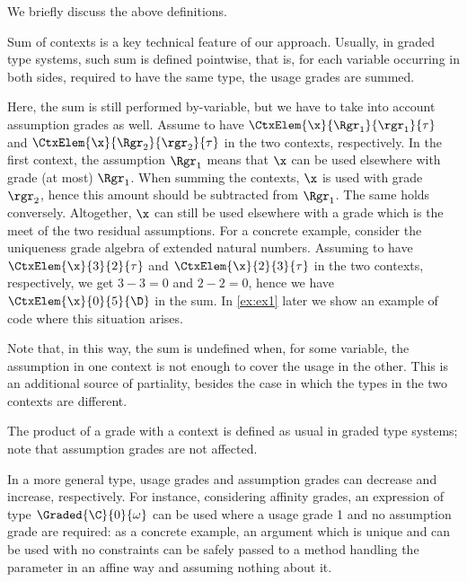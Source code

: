  We briefly discuss the above definitions. 

Sum of contexts is a key technical feature of our approach. 
 Usually, in graded type systems, such sum is defined pointwise, that is, for each variable occurring in both sides, required to have the same type, the usage grades are summed. 

Here, the sum is still performed by-variable, but we have to take into account assumption grades as well. Assume to have $\CtxElem{\x}{\Rgr_1}{\rgr_1}{\tau}$ and $\CtxElem{\x}{\Rgr_2}{\rgr_2}{\tau}$ in the two contexts, respectively. In the first context, the assumption $\Rgr_1$ means that $\x$ can be used elsewhere with grade (at most) $\Rgr_1$.  When summing the contexts, $\x$ is used with grade $\rgr_2$, hence this amount should be subtracted from $\Rgr_1$. The same holds conversely. Altogether, $\x$ can still be used elsewhere with a grade which is the meet of the two residual assumptions. 
For a concrete example, consider the uniqueness grade algebra of extended natural numbers. Assuming to have $\CtxElem{\x}{3}{2}{\tau}$ and $\CtxElem{\x}{2}{3}{\tau}$ in the two contexts, respectively, we get $3-3=0$ and $2-2=0$, hence we have $\CtxElem{\x}{0}{5}{\D}$ in the sum. In \cref{ex:ex1} later we show an example of code where this situation arises. 

Note that, in this way, the sum is undefined when, for some variable, the assumption in one context is not enough to cover the usage in the other. This is an additional source of partiality, besides the case in which the types in the two contexts are different. 

The product of a grade with a context is defined as usual in graded type systems; note that assumption grades are not affected.

In a more general type, usage grades and assumption grades can decrease and increase, respectively. For instance, considering affinity grades,
an expression of type $\Graded{\C}{0}{\omega}$ can be used where a usage grade 1 and no assumption grade are required: as a concrete example, an argument which is unique and can be used with no constraints can be safely passed to a method handling the parameter in an affine way and assuming nothing about it. 

